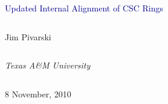 \documentclass[compress]{beamer}
\begin{document}
\begin{frame}
\vfill
\begin{center}
\textcolor{darkblue}{\Large Updated Internal Alignment of CSC Rings}

\vfill
\begin{columns}
\begin{center}
\large
Jim Pivarski
\end{center}
\end{columns}

\begin{columns}
\begin{center}
\scriptsize
{\it Texas A\&M University}
\end{center}
\end{columns}

\vfill
 8 November, 2010

\end{center}
\end{frame}


\small
\end{document}
